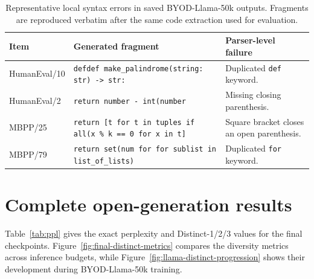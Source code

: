 \documentclass{article}
\begin{document}
\begin{table}[!htbp]
\caption{Representative local syntax errors in saved BYOD-Llama-50k outputs. Fragments are reproduced verbatim after the same code extraction used for evaluation.}
\label{tab:syntax-examples}
\centering
\small
\begin{tabular}{p{}p{}p{}}
\toprule
Item & Generated fragment & Parser-level failure \\
\midrule
HumanEval/10 & \texttt{defdef make\_palindrome(string: str) -> str:} & Duplicated \texttt{def} keyword. \\
HumanEval/2 & \texttt{return number - int(number} & Missing closing parenthesis. \\
MBPP/25 & \texttt{return [t for t in tuples if all(x \% k == 0 for x in t]} & Square bracket closes an open parenthesis. \\
MBPP/79 & \texttt{return set(num for for sublist in list\_of\_lists)} & Duplicated \texttt{for} keyword. \\
\bottomrule
\end{tabular}
\end{table}

\section{Complete open-generation results}
\label{app:open-generation-results}

Table~\ref{tab:ppl} gives the exact perplexity and Distinct-1/2/3 values for the final checkpoints. Figure~\ref{fig:final-distinct-metrics} compares the diversity metrics across inference budgets, while Figure~\ref{fig:llama-distinct-progression} shows their development during BYOD-Llama-50k training.
\end{document}
